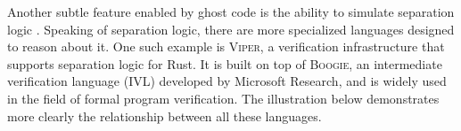 Another subtle feature enabled by ghost code is the ability to simulate separation logic .
Speaking of separation logic, there are more specialized languages designed to reason about it. One such example is \textsc{Viper}, a verification infrastructure that supports separation logic for Rust. It is built on top of \textsc{Boogie}, an intermediate verification language (IVL) developed by Microsoft Research, and is widely used in the field of formal program verification. The illustration below demonstrates more clearly the relationship between all these languages.
    
    
    
    
    
